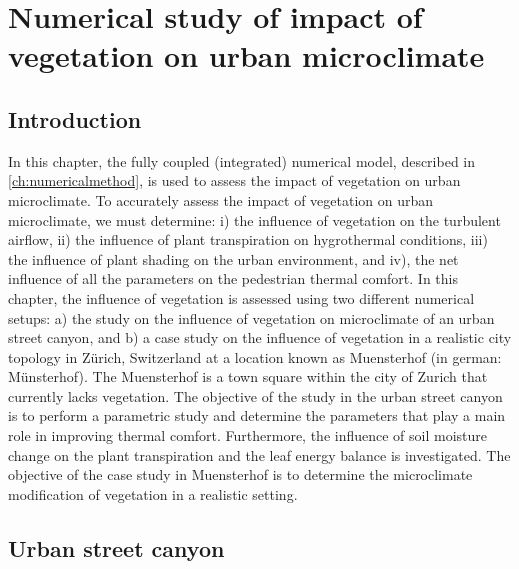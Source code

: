 \chapter{Numerical study of impact of vegetation on urban microclimate}
\label{ch:impactofvegetation}
\def\figdir{chapters/ch08_numericalstudy/figures}	

%		

\section{Introduction}

In this chapter, the fully coupled (integrated) numerical model, described in \cref{ch:numericalmethod}, is used to assess the impact of vegetation on urban microclimate. To accurately assess the impact of vegetation on urban microclimate, we must determine: i) the influence of vegetation on the turbulent airflow, ii) the influence of plant transpiration on hygrothermal conditions, iii) the influence of plant shading on the urban environment, and iv), the net influence of all the parameters on the pedestrian thermal comfort. In this chapter, the influence of vegetation is assessed using two different numerical setups: a) the study on the influence of vegetation on microclimate of an urban street canyon, and b) a case study on the influence of vegetation in a realistic city topology in Z\"urich, Switzerland at a location known as Muensterhof (in german: M\"unsterhof). The Muensterhof is a town square within the city of Zurich that currently lacks vegetation. The objective of the study in the urban street canyon is to perform a parametric study and determine the parameters that play a main role in improving thermal comfort.  Furthermore, the influence of soil moisture change on the plant transpiration and the leaf energy balance is investigated. The objective of the case study in Muensterhof is to determine the microclimate modification of vegetation in a realistic setting.

\section{Urban street canyon}

